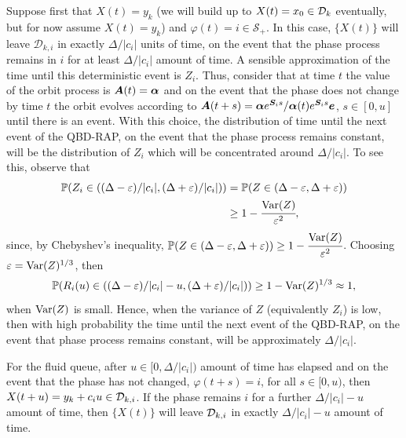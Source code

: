 Suppose first that \(X(t)=y_k\) (we will build up to \(X(t)=x_0\in\mathcal{D}_k\) eventually, but for now assume \(X(t)=y_k\)) and \(\varphi(t)=i\in\mathcal S_+\). In this case, \(\{X(t)\}\) will leave \(\mathcal D_{k,i}\) in exactly \(\Delta/|c_i|\) units of time, on the event that the phase process remains in \(i\) for at least \(\Delta/|c_i|\) amount of time. A sensible approximation of the time until this deterministic event is \(Z_i\). Thus, consider that at time \(t\) the value of the orbit process is \(\boldsymbol A(t)=\boldsymbol \alpha\) and on the event that the phase does not change by time \(t\) the orbit evolves according to \(\boldsymbol A(t+s)=\boldsymbol \alpha e^{\boldsymbol S_is}/\boldsymbol \alpha (t)e^{\boldsymbol S_is}\boldsymbol e\), \(s\in[0,u]\) until there is an event. With this choice, the distribution of time until the next event of the QBD-RAP, on the event that the phase process remains constant, will be the distribution of \(Z_i\) which will be concentrated around \(\Delta/|c_i|\). To see this, observe that 
\begin{align*}
	\mathbb P(Z_i \in{}((\Delta-\varepsilon)/|c_i|, (\Delta+\varepsilon)/|c_i|) ) 
	&= \mathbb P(Z\in{}(\Delta-\varepsilon, \Delta + \varepsilon))
	\\&\geq 1-\cfrac{\mathrm{Var}(Z)}{\varepsilon^2},
\end{align*}
since, by Chebyshev's inequality, \(\mathbb P(Z\in{}(\Delta-\varepsilon, \Delta + \varepsilon)) \geq 1- \cfrac{\mathrm{Var}(Z)}{\varepsilon^2}\). Choosing \(\varepsilon = \mathrm{Var}(Z)^{1/3}\), then 
\[\mathbb P(R_i(u) \in{}((\Delta-\varepsilon)/|c_i|-u, (\Delta+\varepsilon)/|c_i|) )\geq 1-\mathrm{Var}(Z)^{1/3} \approx 1, \]
when \(\mathrm{Var}(Z)\) is small. Hence, when the variance of \(Z\) (equivalently \(Z_i\)) is low, then with high probability the time until the next event of the QBD-RAP, on the event that phase process remains constant, will be approximately \(\Delta/|c_i|\). 

For the fluid queue, after \(u\in{}[0,\Delta/|c_i|)\) amount of time has elapsed and on the event that the phase has not changed, \(\varphi(t+s)=i\), for all \(s\in{}[0,u)\), then \(X(t+u) = y_k + c_i u \in\mathcal{D}_{k,i}\). If the phase remains \(i\) for a further \(\Delta/|c_i|-u\) amount of time, then \(\{X(t)\}\) will leave \(\mathcal{D}_{k,i}\) in exactly \(\Delta/|c_i|-u\) amount of time. 

